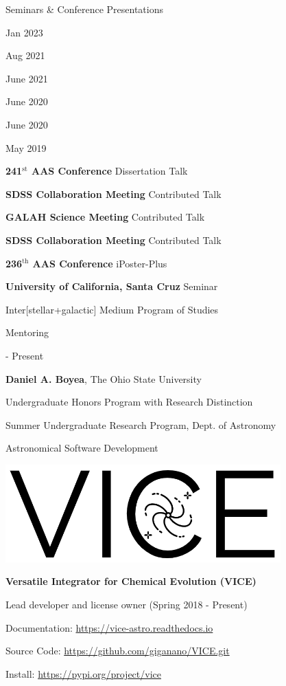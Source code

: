 \documentclass[cv.tex]{subfiles}
\begin{document}
\vspace{5mm}
\noindent
{\color{themecolor} \large Seminars \& Conference Presentations}
\par\noindent
\parbox{0.18\textwidth}{%
	\raggedleft
	Jan 2023 \par
	Aug 2021 \par
	June 2021 \par
	June 2020 \par
	June 2020 \par
	May 2019 \par
	\null
}
\hspace{1mm}
\parbox{0.8\textwidth}{%
	\textbf{241$^\text{st}$ AAS Conference} \hfill Dissertation Talk \par
	\textbf{SDSS Collaboration Meeting} \hfill Contributed Talk \par
	\textbf{GALAH Science Meeting} \hfill Contributed Talk \par
	\textbf{SDSS Collaboration Meeting} \hfill Contributed Talk \par
	\textbf{236$^\text{th}$ AAS Conference} \hfill iPoster-Plus \par
	\textbf{University of California, Santa Cruz} \hfill Seminar \par
	Inter[stellar+galactic] Medium Program of Studies
}

\vspace{5mm}
\noindent
{\color{themecolor} \large Mentoring}
\par\noindent
\parbox{0.18\textwidth}{%
	 - Present \par
	\null \par
	\null
}
\hspace{1mm}
\parbox{0.8\textwidth}{%
	\vspace{1mm}
	\textbf{Daniel A. Boyea}, The Ohio State University \par
	Undergraduate Honors Program with Research Distinction \par
	Summer Undergraduate Research Program, Dept. of Astronomy
}

\vspace{5mm}
\noindent
{%
{\color{themecolor}\large Astronomical Software Development}
\par\noindent
\parbox{0.35\textwidth}{%
	\centering
	\includegraphics[scale = 0.33]{vice-logo.png}
}
\parbox{0.63\textwidth}{%
	\textbf{Versatile Integrator for Chemical Evolution (VICE)} \par
	Lead developer and license owner (Spring 2018 - Present) \par
	Documentation: \url{https://vice-astro.readthedocs.io} \par
	Source Code: \url{https://github.com/giganano/VICE.git} \par
	Install: \url{https://pypi.org/project/vice}
}
}
\end{document}

